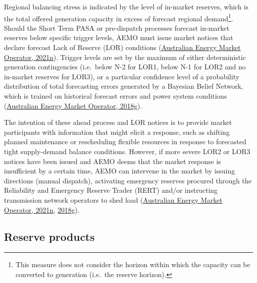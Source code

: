 \documentclass[12pt,a4paper,]{report}
\begin{document}
Regional balancing stress is indicated by the level of in-market
reserves, which is the total offered generation capacity in excess of
forecast regional demand\footnote{This measure does not consider the
  horizon within which the capacity can be converted to generation
  (i.e.~the reserve horizon).}. Should the Short Term PASA or
pre-dispatch processes forecast in-market reserves below specific
trigger levels, AEMO must issue market notices that declare forecast
Lack of Reserve (LOR) conditions
(\protect\hyperlink{ref-australianenergymarketoperatorShortTermReserve2021}{Australian
Energy Market Operator, 2021n}). Trigger levels are set by the maximum
of either deterministic generation contingencies (i.e.~below N-2 for
LOR1, below N-1 for LOR2 and no in-market reserves for LOR3), or a
particular confidence level of a probability distribution of total
forecasting errors generated by a Bayesian Belief Network, which is
trained on historical forecast errors and power system conditions
(\protect\hyperlink{ref-australianenergymarketoperatorReserveLevelDeclaration2018}{Australian
Energy Market Operator, 2018g}).

The intention of these ahead process and LOR notices is to provide
market participants with information that might elicit a response, such
as shifting planned maintenance or rescheduling flexible resources in
response to forecasted tight supply-demand balance conditions. However,
if more severe LOR2 or LOR3 notices have been issued and AEMO deems that
the market response is insufficient by a certain time, AEMO can
intervene in the market by issuing directions (manual dispatch),
activating emergency reserves procured through the Reliability and
Emergency Reserve Trader (RERT) and/or instructing transmission network
operators to shed load
(\protect\hyperlink{ref-australianenergymarketoperatorShortTermReserve2021}{Australian
Energy Market Operator, 2021n},
\protect\hyperlink{ref-australianenergymarketoperatorReserveLevelDeclaration2018}{2018g}).

\hypertarget{sec:reserves-nemreserves}{%
\subsection{Reserve products}\label{sec:reserves-nemreserves}}
\end{document}
